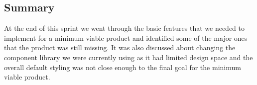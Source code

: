 \subsection{Summary}
At the end of this sprint we went through the basic features that we needed to implement for a minimum viable product and identified some of the major ones that the product was still missing. It was also discussed about changing the component library we were currently using as it had limited design space and the overall default styling was not close enough to the final goal for the minimum viable product.